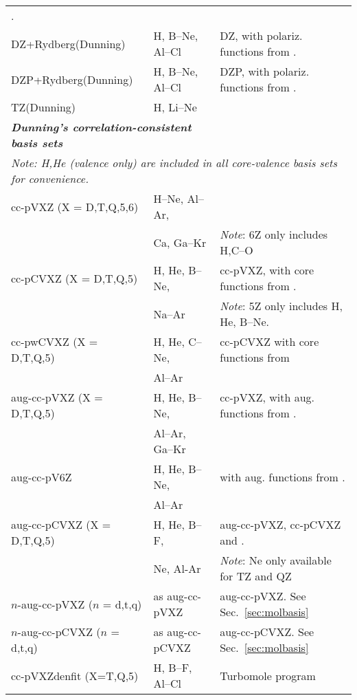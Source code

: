 \begin{longtable}{lll}
  \cite{thdpjhhfs1977,emhfsjcp83}.\\
DZ+Rydberg(Dunning) & H, B--Ne, Al--Cl & DZ, with polariz. functions from
  \cite{thdpjhhfs1977-2}.\\
DZP+Rydberg(Dunning) & H, B--Ne, Al--Cl & DZP, with polariz. functions from 
  \cite{thdpjhhfs1977-2}.\\
TZ(Dunning) & H, Li--Ne & \cite{thdjcp55}\\
\hline
\multicolumn{2}{l}{\bf{\emph{Dunning's correlation-consistent basis 
sets\index{basis set!correlation-consistent}\index{correlation-consistent basis set}}}} \\
\multicolumn{3}{l}{\emph{Note: H,He (valence only) are included in all core-valence basis sets 
  for convenience.}} \\
cc-pVXZ (X = D,T,Q,5,6) & H--Ne, Al--Ar, & \cite{thdjcp90,dewthdjcp100,dewthdjcp98,
  jkkapjpca106,akwdewkapthdjcp110} \\
  & Ca, Ga--Kr & \emph{Note}: 6Z only includes H,C--O\\
cc-pCVXZ (X = D,T,Q,5) & H, He, B--Ne, & cc-pVXZ, with core functions from
  \cite{thdjcp90,jkkapjpca106,dewthdjcp103}. \\
  & Na--Ar & \emph{Note}: 5Z only includes H, He, B--Ne. \\
cc-pwCVXZ (X = D,T,Q,5) & H, He, C--Ne,  & cc-pCVXZ with core functions from 
  \cite{thdjcp90,kapthdjcp117} \\
  & Al--Ar & \\
aug-cc-pVXZ (X = D,T,Q,5) & H, He, B--Ne, & cc-pVXZ, with aug. functions from 
  \cite{thdjcp90,rakthdrjhjcp96,dewthdjcp98,dewthdjcp100}.\\
  & Al--Ar, Ga--Kr & \\
aug-cc-pV6Z & H, He, B--Ne, & \cite{akwtvmthdjsm388,tmakwtdhmp96} with aug. functions from 
  \cite{akwtvmthdjsm388,tmakwtdhmp96,tmthdijqc76}.\\
  & Al--Ar & \\
aug-cc-pCVXZ (X = D,T,Q,5) & H, He, B--F, & aug-cc-pVXZ, cc-pCVXZ and \cite{dewthdjcp103,kapthdjcp117}.\\
  & Ne, Al-Ar & \emph{Note}: Ne only available for TZ and QZ \\
$n$-aug-cc-pVXZ ($n$ = d,t,q) & as aug-cc-pVXZ & aug-cc-pVXZ. See Sec.~\ref{sec:molbasis} \\
$n$-aug-cc-pCVXZ ($n$ = d,t,q) & as aug-cc-pCVXZ & aug-cc-pCVXZ. See Sec.~\ref{sec:molbasis} \\
\hline
\newpage
cc-pVXZdenfit (X=T,Q,5) & H, B--F, Al--Cl & Turbomole program \\

\end{longtable}
